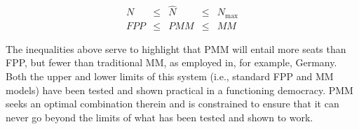 \begin{align}
\label{eq:Nlimits}
N &\le& \hat{N} &\le& N_{\textrm{max}} \\
FPP &\le& PMM &\le& MM
\end{align}

The inequalities above serve to highlight that PMM will entail more seats than FPP, but fewer than traditional MM, as employed in, for example, Germany. 
Both the upper and lower limits of this system (i.e., standard FPP and MM models) have been tested and shown practical in a functioning democracy. PMM seeks an optimal combination therein and is constrained to ensure that it can never go beyond the limits of what has been tested and shown to work.


